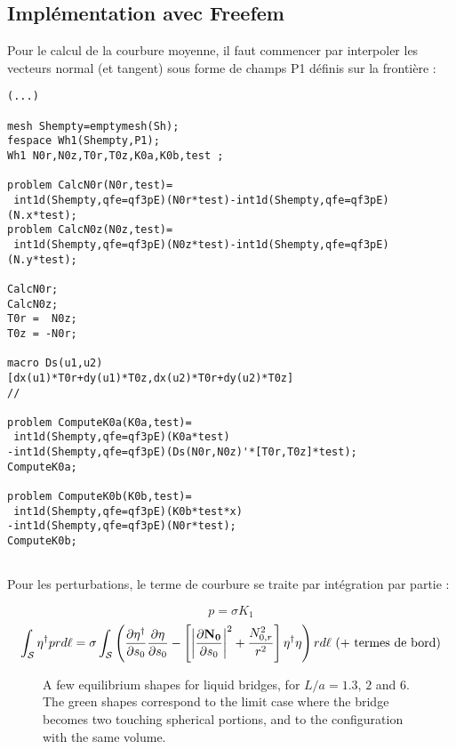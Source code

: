 \subsection{Implémentation avec Freefem}

Pour le calcul de la courbure moyenne, il faut commencer par interpoler les vecteurs normal (et tangent) 
sous forme de champs P1 définis sur la frontière :



\begin{verbatim}
(...)

mesh Shempty=emptymesh(Sh);
fespace Wh1(Shempty,P1);
Wh1 N0r,N0z,T0r,T0z,K0a,K0b,test ;

problem CalcN0r(N0r,test)=
 int1d(Shempty,qfe=qf3pE)(N0r*test)-int1d(Shempty,qfe=qf3pE)(N.x*test);
problem CalcN0z(N0z,test)=
 int1d(Shempty,qfe=qf3pE)(N0z*test)-int1d(Shempty,qfe=qf3pE)(N.y*test);

CalcN0r;
CalcN0z;
T0r =  N0z;
T0z = -N0r;

macro Ds(u1,u2)
[dx(u1)*T0r+dy(u1)*T0z,dx(u2)*T0r+dy(u2)*T0z]
//

problem ComputeK0a(K0a,test)=
 int1d(Shempty,qfe=qf3pE)(K0a*test)
-int1d(Shempty,qfe=qf3pE)(Ds(N0r,N0z)'*[T0r,T0z]*test);
ComputeK0a;

problem ComputeK0b(K0b,test)=
 int1d(Shempty,qfe=qf3pE)(K0b*test*x)
-int1d(Shempty,qfe=qf3pE)(N0r*test);
ComputeK0b;


\end{verbatim}


Pour les perturbations, le terme de courbure se traite par intégration par partie :

$$
p = \sigma K_1 
$$
$$
\int_{\cal S}  \eta^\dag p r d \ell 
 = \sigma 
 \int_{\cal S} \left (
 \DP{\eta^\dag}{s_0} \DP{\eta}{s_0} - \left[ \left| \DP{\bf N_0}{s_0} \right|^2  + \frac{N_{0,r}^2}{r^2} \right]  \eta^\dag \eta \right) r d \ell 
\mbox{ (+ termes de bord)} 
$$









\begin{figure}
\caption{A few equilibrium shapes for liquid bridges, for $L/a= 1.3$, $2$ and $6$.
The green shapes correspond to the limit case where the bridge becomes two touching spherical portions, and to the configuration with the same volume. }
\end{figure}




